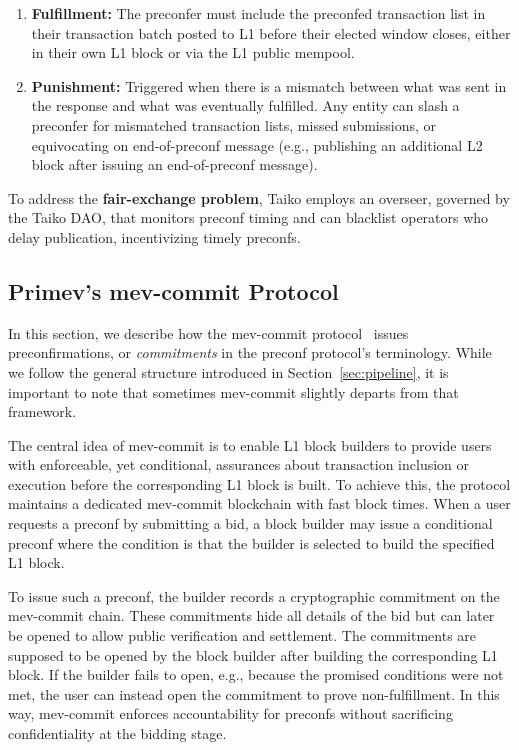 \documentclass[a4paper]{article}
\theoremstyle{boldstyle}
\begin{document}
\begin{enumerate}
        \item \textbf{Fulfillment:} The preconfer must include the preconfed transaction list in their transaction batch posted to L1 before their elected window closes, either in their own L1 block or via the L1 public mempool.
        \item \textbf{Punishment:} Triggered when there is a mismatch between what was sent in the response and what was eventually fulfilled. Any entity can slash a preconfer for mismatched transaction lists, missed submissions, or equivocating on end-of-preconf message (e.g., publishing an additional L2 block after issuing an end-of-preconf message).
        \end{enumerate}
        
        To address the \textbf{fair-exchange problem}, Taiko employs an overseer, governed by the Taiko DAO, that monitors preconf timing and can blacklist operators who delay publication, incentivizing timely preconfs.    

    \subsection{\textbf{Primev's mev-commit Protocol}}
    \label{subsec:primev}
    In this section, we describe how the mev-commit protocol~\cite{W:MevCommitWhitepaper,W:Documentation-Understandingmev-commit} issues preconfirmations, or \emph{commitments} in the preconf protocol's terminology. While we follow the general structure introduced in Section~\ref{sec:pipeline}, it is important to note that sometimes mev-commit slightly departs from that framework. 

    The central idea of mev-commit is to enable L1 block builders to provide users with enforceable, yet conditional, assurances about transaction inclusion or execution before the corresponding L1 block is built. To achieve this, the protocol maintains a dedicated mev-commit blockchain with fast block times. When a user requests a preconf by submitting a bid, a block builder may issue a conditional preconf where the condition is that the builder is selected to build the specified L1 block. 
    
    To issue such a preconf, the builder records a cryptographic commitment on the mev-commit chain. These commitments hide all details of the bid but can later be opened to allow public verification and settlement. The commitments are supposed to be opened by the block builder after building the corresponding L1 block. If the builder fails to open, e.g., because the promised conditions were not met, the user can instead open the commitment to prove non-fulfillment. In this way, mev-commit enforces accountability for preconfs without sacrificing confidentiality at the bidding stage.
\end{document}
